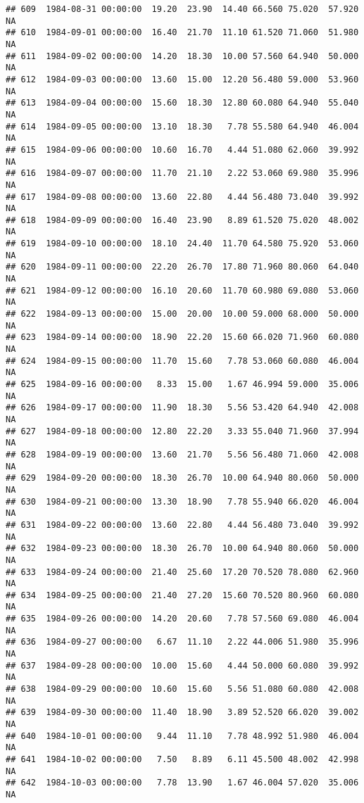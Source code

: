 \documentclass{article}\usepackage{graphicx, color}
\makeatletter
\newenvironment{kframe}{%
 \def\at@end@of@kframe{}%
 \ifinner\ifhmode%
  \def\at@end@of@kframe{\end{minipage}}%
  \begin{minipage}{\columnwidth}%
 \fi\fi%
 \def\FrameCommand##1{\hskip\@totalleftmargin \hskip-\fboxsep
 \colorbox{shadecolor}{##1}\hskip-\fboxsep
     \hskip-\linewidth \hskip-\@totalleftmargin \hskip\columnwidth}%
 \MakeFramed {\advance\hsize-\width
   \@totalleftmargin\z@ \linewidth\hsize
   \@setminipage}}%
 {\par\unskip\endMakeFramed%
 \at@end@of@kframe}
\newenvironment{knitrout}{}{} %
\makeatother
\begin{document}
\begin{knitrout}
\begin{kframe}
\begin{verbatim}
## 609  1984-08-31 00:00:00  19.20  23.90  14.40 66.560 75.020  57.920     NA
## 610  1984-09-01 00:00:00  16.40  21.70  11.10 61.520 71.060  51.980     NA
## 611  1984-09-02 00:00:00  14.20  18.30  10.00 57.560 64.940  50.000     NA
## 612  1984-09-03 00:00:00  13.60  15.00  12.20 56.480 59.000  53.960     NA
## 613  1984-09-04 00:00:00  15.60  18.30  12.80 60.080 64.940  55.040     NA
## 614  1984-09-05 00:00:00  13.10  18.30   7.78 55.580 64.940  46.004     NA
## 615  1984-09-06 00:00:00  10.60  16.70   4.44 51.080 62.060  39.992     NA
## 616  1984-09-07 00:00:00  11.70  21.10   2.22 53.060 69.980  35.996     NA
## 617  1984-09-08 00:00:00  13.60  22.80   4.44 56.480 73.040  39.992     NA
## 618  1984-09-09 00:00:00  16.40  23.90   8.89 61.520 75.020  48.002     NA
## 619  1984-09-10 00:00:00  18.10  24.40  11.70 64.580 75.920  53.060     NA
## 620  1984-09-11 00:00:00  22.20  26.70  17.80 71.960 80.060  64.040     NA
## 621  1984-09-12 00:00:00  16.10  20.60  11.70 60.980 69.080  53.060     NA
## 622  1984-09-13 00:00:00  15.00  20.00  10.00 59.000 68.000  50.000     NA
## 623  1984-09-14 00:00:00  18.90  22.20  15.60 66.020 71.960  60.080     NA
## 624  1984-09-15 00:00:00  11.70  15.60   7.78 53.060 60.080  46.004     NA
## 625  1984-09-16 00:00:00   8.33  15.00   1.67 46.994 59.000  35.006     NA
## 626  1984-09-17 00:00:00  11.90  18.30   5.56 53.420 64.940  42.008     NA
## 627  1984-09-18 00:00:00  12.80  22.20   3.33 55.040 71.960  37.994     NA
## 628  1984-09-19 00:00:00  13.60  21.70   5.56 56.480 71.060  42.008     NA
## 629  1984-09-20 00:00:00  18.30  26.70  10.00 64.940 80.060  50.000     NA
## 630  1984-09-21 00:00:00  13.30  18.90   7.78 55.940 66.020  46.004     NA
## 631  1984-09-22 00:00:00  13.60  22.80   4.44 56.480 73.040  39.992     NA
## 632  1984-09-23 00:00:00  18.30  26.70  10.00 64.940 80.060  50.000     NA
## 633  1984-09-24 00:00:00  21.40  25.60  17.20 70.520 78.080  62.960     NA
## 634  1984-09-25 00:00:00  21.40  27.20  15.60 70.520 80.960  60.080     NA
## 635  1984-09-26 00:00:00  14.20  20.60   7.78 57.560 69.080  46.004     NA
## 636  1984-09-27 00:00:00   6.67  11.10   2.22 44.006 51.980  35.996     NA
## 637  1984-09-28 00:00:00  10.00  15.60   4.44 50.000 60.080  39.992     NA
## 638  1984-09-29 00:00:00  10.60  15.60   5.56 51.080 60.080  42.008     NA
## 639  1984-09-30 00:00:00  11.40  18.90   3.89 52.520 66.020  39.002     NA
## 640  1984-10-01 00:00:00   9.44  11.10   7.78 48.992 51.980  46.004     NA
## 641  1984-10-02 00:00:00   7.50   8.89   6.11 45.500 48.002  42.998     NA
## 642  1984-10-03 00:00:00   7.78  13.90   1.67 46.004 57.020  35.006     NA

\end{verbatim}
\end{kframe}
\end{knitrout}
\end{document}
